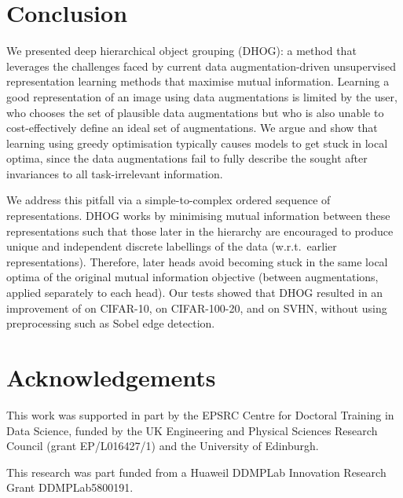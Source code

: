 \documentclass[runningheads]{llncs}
\begin{document}
\begin{table*}[!htbp]
\begin{tabular}{|cccccccccc|}
\hline
  

\end{tabular}
\vspace{1mm}
\caption{Images that yielded the top probability for each discrete label for an early, , and late, , head, taken from a single DHOG run on Cifar-10. The average image for the top 10 is also shown. Note particularly the those images grouped by the early head are less diverse than those grouped by the later head. The label associated largely with frogs (8 for the earlier head and 3 for the later head) exemplifies this well.}\label{tab:images}
\end{table*}







\section{Conclusion}\label{sec:conclusion}
We presented deep hierarchical object grouping (DHOG): a method that leverages the challenges faced by current data augmentation-driven unsupervised representation learning methods that maximise mutual information. Learning a good representation of an image using data augmentations is limited by the user, who chooses the set of plausible data augmentations but who is also unable to cost-effectively define an ideal set of augmentations. We argue and show that learning using greedy optimisation typically causes models to get stuck in local optima, since the data augmentations fail to fully describe the sought after invariances to all task-irrelevant information.

We address this pitfall via a simple-to-complex ordered sequence of representations. DHOG works by minimising mutual information between these representations such that those later in the hierarchy are encouraged to produce unique and independent discrete labellings of the data (w.r.t.~earlier representations). Therefore, later heads avoid becoming stuck in the same local optima of the original mutual information objective (between augmentations, applied separately to each head). Our tests showed that DHOG resulted in an improvement of  on CIFAR-10,  on CIFAR-100-20, and  on SVHN, without using preprocessing such as Sobel edge detection.


\section*{Acknowledgements}

This work was supported in part by the EPSRC Centre for Doctoral Training in Data Science, funded by the UK Engineering and Physical Sciences Research Council (grant EP/L016427/1) and the University of Edinburgh.

This research was part funded from a Huaweil DDMPLab Innovation Research Grant DDMPLab5800191.













\end{document}
